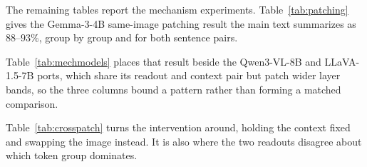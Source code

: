 \documentclass{article}
\newif\ifshort
\newcommand{\gemma}{Gemma-3-4B}
\newcommand{\qwen}{Qwen3-VL-8B}
\newcommand{\llava}{LLaVA-1.5-7B}
\begin{document}
\ifshort
Table~\ref{tab:patching} gives the \gemma{} same-image patching result the main text summarizes as $88$--$93\%$, group by group and for both sentence pairs.



Table~\ref{tab:models} collects the four-model comparison across all three readouts.



Table~\ref{tab:mechmodels} places the \gemma{} same-image patching result of \S\ref{sec:mechanism} beside the \qwen{} and \llava{} ports, which share its readout and context pair but patch wider layer bands, so the three columns bound a pattern rather than forming a matched comparison. Appendix~\ref{app:patching} gives the design and layer band used for each.


\else
The remaining tables report the mechanism experiments. Table~\ref{tab:patching} gives the \gemma{} same-image patching result the main text summarizes as $88$--$93\%$, group by group and for both sentence pairs.



Table~\ref{tab:mechmodels} places that result beside the \qwen{} and \llava{} ports, which share its readout and context pair but patch wider layer bands, so the three columns bound a pattern rather than forming a matched comparison.


\fi

Table~\ref{tab:crosspatch} turns the intervention around, holding the context fixed and swapping the image instead. It is also where the two readouts disagree about which token group dominates.
\end{document}
